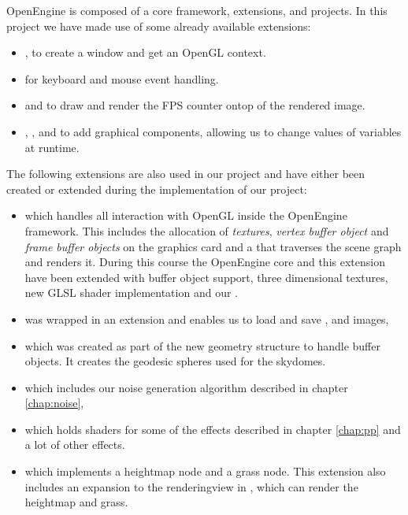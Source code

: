 OpenEngine is composed of a core framework, extensions, and
projects. In this project we have made use of some already available
extensions:

\begin{itemize}
  \item {}, to create a window and get an OpenGL context.
  \item {} for keyboard and mouse event handling.
  \item {} and  to draw and render the FPS
    counter ontop of the rendered image.
  \item {}, , and
     to add graphical components, allowing us to
    change values of variables at runtime.
\end{itemize}

The following extensions are also used in our project and have either
been created or extended during the implementation of our project:

\begin{itemize}
  \item {} which handles all interaction with
    OpenGL inside the OpenEngine framework. This includes the
    allocation of \emph{textures}, \emph{vertex buffer object} and
    \emph{frame buffer objects} on the graphics card and a
     that traverses the scene graph and renders
    it. During this course the OpenEngine core and this extension have
    been extended with buffer object support, three dimensional
    textures, new GLSL shader implementation and our
    .
  \item {} was wrapped in an extension and enables us to
    load and save ,  and  images,
  \item {} which was created as part of the new geometry
    structure to handle  buffer objects. It creates the geodesic
    spheres used for the skydomes.
  \item {} which includes our noise generation algorithm
    described in chapter \ref{chap:noise},
  \item {} which holds shaders for
    some of the effects described in chapter \ref{chap:pp} and a lot
    of other effects.
  \item {} which implements a heightmap node and a grass
    node. This extension also includes an expansion to the
    renderingview in , which can render the
    heightmap and grass.
\end{itemize}

